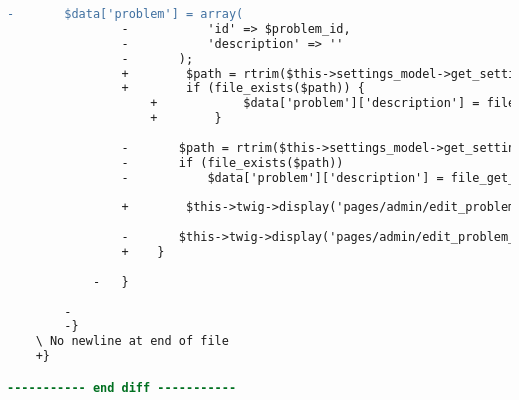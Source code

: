 \begin{lstlisting}[language=diff, caption=Perubahan pada kode Problems.php]
				-		$data['problem'] = array(
				-			'id' => $problem_id,
				-			'description' => ''
				-		);
				+        $path = rtrim($this->settings_model->get_setting('assignments_root'), '/')."/assignment_{$assignment_id}/p{$problem_id}/desc.".$ext;
				+        if (file_exists($path)) {
					+            $data['problem']['description'] = file_get_contents($path);
					+        }
				
				-		$path = rtrim($this->settings_model->get_setting('assignments_root'),'/')."/assignment_{$assignment_id}/p{$problem_id}/desc.".$ext;
				-		if (file_exists($path))
				-			$data['problem']['description'] = file_get_contents($path);
				
				+        $this->twig->display('pages/admin/edit_problem_'.$type.'.twig', $data);
				
				-		$this->twig->display('pages/admin/edit_problem_'.$type.'.twig', $data);
				+    }
			
			-	}
		
		-
		-}
	\ No newline at end of file
	+}

----------- end diff -----------
\end{lstlisting}

